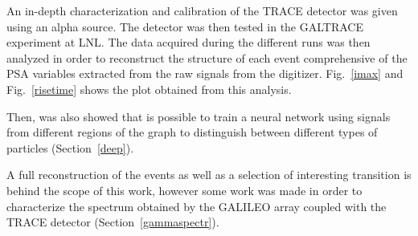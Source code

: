 An in-depth characterization and calibration of the TRACE detector was given using an alpha source. The detector was then tested in the GALTRACE experiment at LNL. The data acquired during the different runs was then analyzed in order to reconstruct the structure of each event comprehensive of the PSA variables extracted from the raw signals from the digitizer. Fig.~\ref{imax} and Fig.~\ref{risetime} shows the plot obtained from this analysis.


Then, was also showed that is possible to train a neural network using signals from different regions of the graph to distinguish between different types of particles (Section~\ref{deep}).


A full reconstruction of the events as well as a selection of interesting transition is behind the scope of this work, however some work was made in order to characterize the spectrum obtained by the GALILEO array coupled with the TRACE detector (Section~\ref{gammaspectr}).
